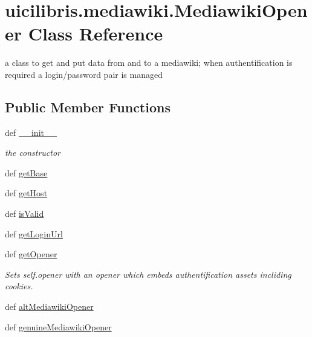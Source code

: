 \hypertarget{classuicilibris_1_1mediawiki_1_1MediawikiOpener}{\section{uicilibris.\-mediawiki.\-Mediawiki\-Opener \-Class \-Reference}
\label{classuicilibris_1_1mediawiki_1_1MediawikiOpener}
}


a class to get and put data from and to a mediawiki; when authentification is required a login/password pair is managed  


\subsection*{\-Public \-Member \-Functions}
\begin{DoxyCompactItemize}
\item 
def \hyperlink{classuicilibris_1_1mediawiki_1_1MediawikiOpener_aa2d6ba1aea4a540e973e676df6bd6641}{\-\_\-\-\_\-init\-\_\-\-\_\-}
\begin{DoxyCompactList}\small\item\em the constructor \end{DoxyCompactList}\item 
def \hyperlink{classuicilibris_1_1mediawiki_1_1MediawikiOpener_ae3d9facf26d5514b9738cceeeee610e6}{get\-Base}
\item 
def \hyperlink{classuicilibris_1_1mediawiki_1_1MediawikiOpener_afec4489c4a9c5f9c01e0c85842924ef8}{get\-Host}
\item 
def \hyperlink{classuicilibris_1_1mediawiki_1_1MediawikiOpener_a3a033add2471f9832019b5b9ea92d573}{is\-Valid}
\item 
def \hyperlink{classuicilibris_1_1mediawiki_1_1MediawikiOpener_acb7c859c9e9ef620cf6f6665f015fb15}{get\-Login\-Url}
\item 
def \hyperlink{classuicilibris_1_1mediawiki_1_1MediawikiOpener_aa329295cca8906f4f26a735fc26e16fd}{get\-Opener}
\begin{DoxyCompactList}\small\item\em \-Sets self.\-opener with an opener which embeds authentification assets incliding cookies. \end{DoxyCompactList}\item 
def \hyperlink{classuicilibris_1_1mediawiki_1_1MediawikiOpener_ae4c086c260afec399ece3f3191d52ba1}{alt\-Mediawiki\-Opener}
\item 
def \hyperlink{classuicilibris_1_1mediawiki_1_1MediawikiOpener_ab3c591d43d9c513c655b9c7b42d6f456}{genuine\-Mediawiki\-Opener}

\end{DoxyCompactItemize}
